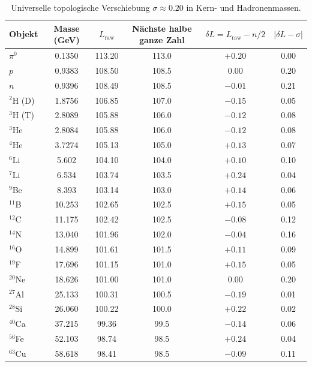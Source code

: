 \documentclass[12pt,a4paper]{article}
\begin{document}
	\begin{table}[htbp]
		\centering
		\caption{Universelle topologische Verschiebung \(\sigma \approx 0.20\) in Kern- und Hadronenmassen.}
		\label{tab:nuclear_sigma}
		\small
		\begin{tabular}{l c c c c c}
			\toprule
			Objekt & Masse (GeV) & \(L_{\mathrm{raw}}\) & Nächste halbe ganze Zahl & \(\delta L = L_{\mathrm{raw}} - n/2\) & \(|\delta L - \sigma|\) \\
			\midrule
			\(\pi^0\) & 0.1350 & 113.20 & 113.0 & \(+0.20\) & 0.00 \\
			\(p\)     & 0.9383 & 108.50 & 108.5 & \(0.00\)  & 0.20 \\
			\(n\)     & 0.9396 & 108.49 & 108.5 & \(-0.01\) & 0.21 \\
			\(^2\)H (D) & 1.8756 & 106.85 & 107.0 & \(-0.15\) & 0.05 \\
			\(^3\)H (T) & 2.8089 & 105.88 & 106.0 & \(-0.12\) & 0.08 \\
			\(^3\)He & 2.8084 & 105.88 & 106.0 & \(-0.12\) & 0.08 \\
			\(^4\)He & 3.7274 & 105.13 & 105.0 & \(+0.13\) & 0.07 \\
			\(^6\)Li & 5.602  & 104.10 & 104.0 & \(+0.10\) & 0.10 \\
			\(^7\)Li & 6.534  & 103.74 & 103.5 & \(+0.24\) & 0.04 \\
			\(^9\)Be & 8.393  & 103.14 & 103.0 & \(+0.14\) & 0.06 \\
			\(^{11}\)B & 10.253 & 102.65 & 102.5 & \(+0.15\) & 0.05 \\
			\(^{12}\)C & 11.175 & 102.42 & 102.5 & \(-0.08\) & 0.12 \\
			\(^{14}\)N & 13.040 & 101.96 & 102.0 & \(-0.04\) & 0.16 \\
			\(^{16}\)O & 14.899 & 101.61 & 101.5 & \(+0.11\) & 0.09 \\
			\(^{19}\)F & 17.696 & 101.15 & 101.0 & \(+0.15\) & 0.05 \\
			\(^{20}\)Ne & 18.626 & 101.00 & 101.0 & \(0.00\)  & 0.20 \\
			\(^{27}\)Al & 25.133 & 100.31 & 100.5 & \(-0.19\) & 0.01 \\
			\(^{28}\)Si & 26.060 & 100.22 & 100.0 & \(+0.22\) & 0.02 \\
			\(^{40}\)Ca & 37.215 & 99.36  & 99.5  & \(-0.14\) & 0.06 \\
			\(^{56}\)Fe & 52.103 & 98.74  & 98.5  & \(+0.24\) & 0.04 \\
			\(^{63}\)Cu & 58.618 & 98.41  & 98.5  & \(-0.09\) & 0.11 \\

\end{tabular}
\end{table}
\end{document}
